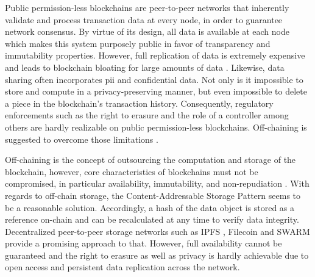 Public permission-less blockchains are peer-to-peer networks that inherently validate and process transaction data at every node, in order to guarantee network consensus. By virtue of its design, all data is available at each node which makes this system purposely public in favor of transparency and immutability properties. However, full replication of data is extremely expensive and leads to blockchain bloating for large amounts of data \cite{eberhardtBlockchainInsightsOffChaining2017}. Likewise, data sharing often incorporates \acrshort{pii} and confidential data. Not only is it impossible to store and compute in a privacy-preserving manner, but even impossible to delete a piece in the blockchain's transaction history. Consequently, regulatory enforcements such as the right to erasure \cite[Art. 17]{european_commission_regulation_2016} and the role of a controller \cite[Art. 4 (7)]{european_commission_regulation_2016} among others are hardly realizable on public permission-less blockchains. Off-chaining is suggested to overcome those limitations \cite{eberhardtBlockchainInsightsOffChaining2017}.

Off-chaining is the concept of outsourcing the computation and storage of the blockchain, however, core characteristics of blockchains must not be compromised, in particular availability, immutability, and non-repudiation \cite{eberhardtOffchainingModelsApproaches2018,eberhardtBlockchainInsightsOffChaining2017}. With regards to off-chain storage, the Content-Addressable Storage Pattern \cite{eberhardtBlockchainInsightsOffChaining2017} seems to be a reasonable solution. Accordingly, a hash of the data object is stored as a reference on-chain and can be recalculated at any time to verify data integrity. Decentralized peer-to-peer storage networks such as IPFS \cite{benetIPFSContentAddressed2014}, Filecoin \cite{filecoin} and SWARM \cite{swarm} provide a promising approach to that. However, full availability cannot be guaranteed \cite{eberhardtOffchainingModelsApproaches2018} and the right to erasure \cite[Art. 17]{european_commission_regulation_2016} as well as privacy is hardly achievable due to open access and persistent data replication across the network.

